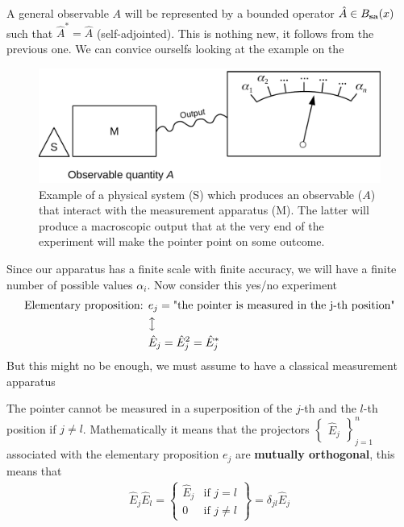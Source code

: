 \documentclass[../main.tex]{subfiles}
\begin{document}
A general observable $A$ will be represented by a bounded operator $\hat{A}\in B_{\textrm{\textbf{sa}}}(x)$ such that $\hat{A}^*=\hat{A}$ (self-adjointed). This is nothing new, it follows from the previous one. We can convice ourselfs looking at the example on the 
\begin{figure}[H]
	\includegraphics{images/strumento_misura_osservabile.pdf}
	\caption[Apparatus to measure a quantity]{Example of a physical system (S) which produces an observable ($A$) that interact with the measurement apparatus (M). The latter will produce a macroscopic output that at the very end of the experiment will make the pointer point on some outcome.}
\end{figure}
Since our apparatus has a finite scale with finite accuracy, we will have a finite number of possible values $\alpha_i$. 
Now consider this yes/no experiment
\[
\begin{split}
\textrm{Elementary proposition: } &e_j = \textrm{"the pointer is measured in the j-th position"}\\
&\big\updownarrow\\
& \hat{E}_j = \hat{E}_j^2=\hat{E}_j^\ast
\end{split}
\]
But this might no be enough, we must assume to have a classical measurement apparatus
\begin{assumption} The pointer cannot be measured in a superposition of the $j$-th and the $l$-th position if $j\neq l$. Mathematically it means that the projectors $\begin{Bmatrix}
  \hat{E}_j
\end{Bmatrix}_{j=1}^n$ associated with the elementary proposition $e_j$ are \textbf{mutually orthogonal}, this means that
\begin{align*}
\hat{E}_j\hat{E}_l=
\begin{Bmatrix}
\hat{E}_j & \mbox{if } j=l\\
0 & \mbox{if } j\ne l
\end{Bmatrix}=\delta_{jl}\hat{E}_j
\end{align*}
\end{assumption}
\end{document}
